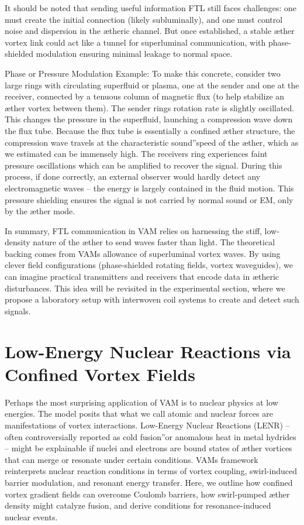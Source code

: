 It should be noted that sending useful information FTL still faces challenges: one must create the initial connection (likely subluminally), and one must control noise and dispersion in the ætheric channel. But once established, a stable æther vortex link could act like a tunnel for superluminal communication, with phase-shielded modulation ensuring minimal leakage to normal space.


Phase or Pressure Modulation Example: To make this concrete, consider two large rings with circulating superfluid or plasma, one at the sender and one at the receiver, connected by a tenuous column of magnetic flux (to help stabilize an æther vortex between them). The sender ring\rqs s rotation rate is slightly oscillated. This changes the pressure in the superfluid, launching a compression wave down the flux tube. Because the flux tube is essentially a confined æther structure, the compression wave travels at the characteristic \grqq sound\textquotedblright speed of the æther, which as we estimated can be immensely high. The receiver\rqs s ring experiences faint pressure oscillations which can be amplified to recover the signal. During this process, if done correctly, an external observer would hardly detect any electromagnetic waves – the energy is largely contained in the fluid motion. This pressure shielding ensures the signal is not carried by normal sound or EM, only by the æther mode.


In summary, FTL communication in VAM relies on harnessing the stiff, low-density nature of the æther to send waves faster than light. The theoretical backing comes from VAM\rqs s allowance of superluminal vortex waves. By using clever field configurations (phase-shielded rotating fields, vortex waveguides), we can imagine practical transmitters and receivers that encode data in ætheric disturbances. This idea will be revisited in the experimental section, where we propose a laboratory setup with interwoven coil systems to create and detect such signals.


\section*{Low-Energy Nuclear Reactions via Confined Vortex Fields}

Perhaps the most surprising application of VAM is to nuclear physics at low energies. The model posits that what we call atomic and nuclear forces are manifestations of vortex interactions. Low-Energy Nuclear Reactions (LENR) – often controversially reported as \grqq cold fusion\textquotedblright or anomalous heat in metal hydrides – might be explainable if nuclei and electrons are bound states of æther vortices that can merge or resonate under certain conditions. VAM\rqs s framework reinterprets nuclear reaction conditions in terms of vortex coupling, swirl-induced barrier modulation, and resonant energy transfer. Here, we outline how confined vortex gradient fields can overcome Coulomb barriers, how swirl-pumped æther density might catalyze fusion, and derive conditions for resonance-induced nuclear events.



